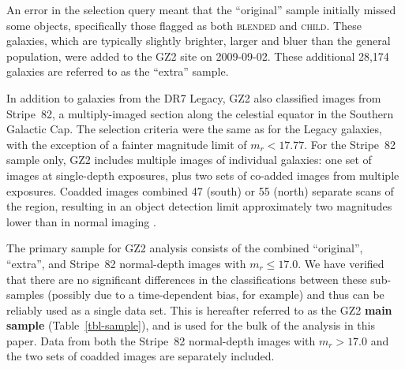 \documentclass[useAMS,usenatbib]{mn2e}
\begin{document}
An error in the selection query meant that the ``original'' sample initially missed some objects, specifically those flagged as both \textsc{blended} and \textsc{child}. These galaxies, which are typically slightly brighter, larger and bluer than the general population, were added to the GZ2 site on 2009-09-02. These additional 28,174 galaxies are referred to as the ``extra'' sample. 

In addition to galaxies from the DR7 Legacy, GZ2 also classified images from Stripe~82, a multiply-imaged section along the celestial equator in the Southern Galactic Cap. The selection criteria were the same as for the Legacy galaxies, with the exception of a fainter magnitude limit of $m_r < 17.77$. For the Stripe~82 sample only, GZ2 includes multiple images of individual galaxies: one set of images at single-depth exposures, plus two sets of co-added images from multiple exposures. Coadded images combined 47 (south) or 55 (north) separate scans of the region, resulting in an object detection limit approximately two magnitudes lower than in normal imaging \citep{ann11}. 

The primary sample for GZ2 analysis consists of the combined ``original'', ``extra'', and Stripe~82 normal-depth images with $m_r\leq17.0$. We have verified that there are no significant differences in the classifications between these sub-samples (possibly due to a time-dependent bias, for example) and thus can be reliably used as a single data set. This is hereafter referred to as the GZ2 {\bf main sample} (Table~\ref{tbl-sample}), and is used for the bulk of the analysis in this paper. Data from both the Stripe~82 normal-depth images with $m_r>17.0$ and the two sets of coadded images are separately included. 
\end{document}
